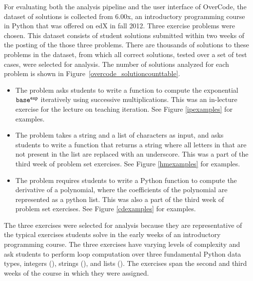For evaluating both the analysis pipeline and the user interface of OverCode, the dataset of solutions is collected from 6.00x, an introductory programming course in Python that was offered on edX in fall 2012. Three exercise problems were chosen. This dataset consists of student solutions submitted within two weeks of the posting of the those three problems. There are thousands of solutions to these problems in the dataset, from which all correct solutions, tested over a set of test cases, were selected for analysis. The number of solutions analyzed for each problem is shown in Figure~\ref{overcode_solutioncounttable}.




\begin{itemize}
\item {\bf {}} The  problem asks students to write a function to compute the exponential $\texttt{base}^{\texttt{exp}}$ iteratively using successive multiplications. This was an in-lecture exercise for the lecture on teaching iteration. See Figure \ref{ipexamples} for examples.
\item {\bf {}} The  problem takes a string  and a list of characters  as input, and asks students to write a function that returns a string where all letters in  that are not present in the list  are replaced with an underscore. This was a part of the third week of problem set exercises. See Figure \ref{hmexamples} for examples.
\item {\bf {}} The  problem requires students to write a Python function to compute the derivative of a polynomial, where the coefficients of the polynomial are represented as a python list. This was also a part of the third week of problem set exercises. See Figure \ref{cdexamples} for examples.
\end{itemize}

The three exercises were selected for analysis because they are representative of the typical exercises students solve in the early weeks of an introductory programming course. The three exercises have varying levels of complexity and ask students to perform loop computation over three fundamental Python data types, integers (), strings (), and lists (). The exercises span the second and third weeks of the course in which they were assigned.

